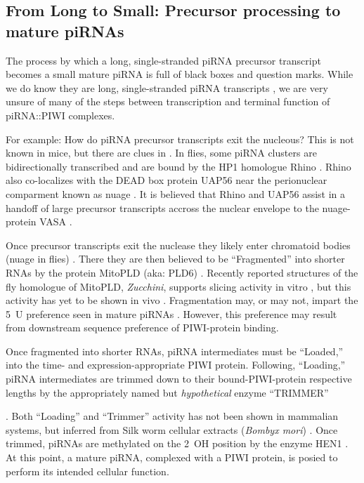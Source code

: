 {  \subsection{From Long to Small: Precursor processing to mature piRNAs}
    \label{Intro:subsec:Intro:Mouse piRNAs}

    The process by which a long, single-stranded piRNA precursor transcript becomes a small mature piRNA is full of black boxes and question marks. While we do know they are long, single-stranded piRNA transcripts \citep{Brennecke2007,Li2013e}, we are very unsure of many of the steps between transcription and terminal function of piRNA::PIWI complexes.

    For example: How do piRNA precursor transcripts exit the nucleous? This is not known in mice, but there are clues in \flies{}. In flies, some piRNA clusters are bidirectionally transcribed and are bound by the HP1 homologue Rhino \citep{Klattenhoff2009}. Rhino also co-localizes with the DEAD box protein UAP56 near the perionuclear comparment known as nuage \citep{Zhang2012}. It is believed that Rhino and UAP56 assist in a handoff of large precursor transcripts accross the nuclear envelope to the nuage-protein VASA \citep{Zhang2012}.

    Once precursor transcripts exit the nuclease they likely enter chromatoid bodies (nuage in flies) \citep{Lim2007,Meikar2011,Zhang2012}. There they are then believed to be ``Fragmented'' into shorter RNAs \citep{Li2013} by the protein MitoPLD (aka: PLD6) \citep{Watanabe2011a}. Recently reported structures of the fly homologue of MitoPLD, \textit{Zucchini}, supports slicing activity in vitro \citep{Nishimasu2012,Ipsaro2012}, but this activity has yet to be shown in vivo \citep{Luteijn2013}. Fragmentation may, or may not, impart the 5\textprime~U preference seen in mature piRNAs \citep{Gunawardane2007,Brennecke2007}. However, this preference may result from downstream sequence preference of PIWI-protein binding.

    Once fragmented into shorter RNAs, piRNA intermediates must be ``Loaded,'' into the time- and expression-appropriate PIWI protein. Following, ``Loading,'' piRNA intermediates are trimmed down to their bound-PIWI-protein respective lengths by the appropriately named but \textit{hypothetical} enzyme ``TRIMMER'' \citep{Kawaoka2011}}. Both ``Loading'' and ``Trimmer'' activity has not been shown in mammalian systems, but inferred from Silk worm cellular extracts (\textit{Bombyx mori}) \citep{Kawaoka2009}. Once trimmed, piRNAs are methylated on the 2\textprime~OH position by the enzyme HEN1 \citep{Horwich2007,Kirino2007,Kirino2007,Kawaoka2011}. At this point, a mature piRNA, complexed with a PIWI protein, is posied to perform its intended cellular function.

